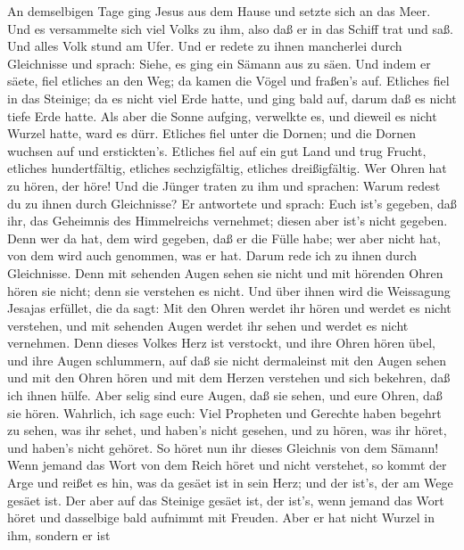  An demselbigen Tage ging Jesus aus dem Hause und setzte
sich an das Meer.  Und es versammelte sich viel Volks zu
ihm, also daß er in das Schiff trat und saß. Und alles Volk stund am
Ufer.  Und er redete zu ihnen mancherlei durch Gleichnisse
und sprach: Siehe, es ging ein Sämann aus zu säen.  Und
indem er säete, fiel etliches an den Weg; da kamen die Vögel und
fraßen's auf.  Etliches fiel in das Steinige; da es nicht
viel Erde hatte, und ging bald auf, darum daß es nicht tiefe Erde hatte.
 Als aber die Sonne aufging, verwelkte es, und dieweil es
nicht Wurzel hatte, ward es dürr.  Etliches fiel unter die
Dornen; und die Dornen wuchsen auf und erstickten's. 
Etliches fiel auf ein gut Land und trug Frucht, etliches hundertfältig,
etliches sechzigfältig, etliches dreißigfältig.  Wer Ohren
hat zu hören, der höre!  Und die Jünger traten zu ihm und
sprachen: Warum redest du zu ihnen durch Gleichnisse?  Er
antwortete und sprach: Euch ist's gegeben, daß ihr, das Geheimnis des
Himmelreichs vernehmet; diesen aber ist's nicht gegeben. 
Denn wer da hat, dem wird gegeben, daß er die Fülle habe; wer aber nicht
hat, von dem wird auch genommen, was er hat.  Darum rede
ich zu ihnen durch Gleichnisse. Denn mit sehenden Augen sehen sie nicht
und mit hörenden Ohren hören sie nicht; denn sie verstehen es nicht.
 Und über ihnen wird die Weissagung Jesajas erfüllet, die
da sagt: Mit den Ohren werdet ihr hören und werdet es nicht verstehen,
und mit sehenden Augen werdet ihr sehen und werdet es nicht vernehmen.
 Denn dieses Volkes Herz ist verstockt, und ihre Ohren
hören übel, und ihre Augen schlummern, auf daß sie nicht dermaleinst mit
den Augen sehen und mit den Ohren hören und mit dem Herzen verstehen und
sich bekehren, daß ich ihnen hülfe.  Aber selig sind eure
Augen, daß sie sehen, und eure Ohren, daß sie hören. 
Wahrlich, ich sage euch: Viel Propheten und Gerechte haben begehrt zu
sehen, was ihr sehet, und haben's nicht gesehen, und zu hören, was ihr
höret, und haben's nicht gehöret.  So höret nun ihr dieses
Gleichnis von dem Sämann!  Wenn jemand das Wort von dem
Reich höret und nicht verstehet, so kommt der Arge und reißet es hin,
was da gesäet ist in sein Herz; und der ist's, der am Wege gesäet ist.
 Der aber auf das Steinige gesäet ist, der ist's, wenn
jemand das Wort höret und dasselbige bald aufnimmt mit Freuden.
 Aber er hat nicht Wurzel in ihm, sondern er ist
